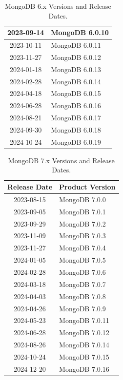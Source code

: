 \documentclass[../main.tex]{subfiles}
\begin{document}
\begin{table}[H]
\begin{minipage}{0.45\textwidth}
\begin{tabular}{|c|l|}
    2023-09-14 & MongoDB 6.0.10 \\ \hline
    2023-10-11 & MongoDB 6.0.11 \\ \hline
    2023-11-27 & MongoDB 6.0.12 \\ \hline
    2024-01-18 & MongoDB 6.0.13 \\ \hline
    2024-02-28 & MongoDB 6.0.14 \\ \hline
    2024-04-18 & MongoDB 6.0.15 \\ \hline
    2024-06-28 & MongoDB 6.0.16 \\ \hline
    2024-08-21 & MongoDB 6.0.17 \\ \hline
    2024-09-30 & MongoDB 6.0.18 \\ \hline
    2024-10-24 & MongoDB 6.0.19 \\ \hline
\end{tabular}
\caption{MongoDB 6.x Versions and Release Dates. \protect\footnotemark}
\label{table:mongodb_versions}
\end{minipage}
\end{table}


\begin{table}[h]
\centering
\begin{tabular}{|c|l|}
\hline
\textbf{Release Date} & \textbf{Product Version} \\ \hline
    2023-08-15 & MongoDB 7.0.0 \\ \hline
    2023-09-05 & MongoDB 7.0.1 \\ \hline
    2023-09-29 & MongoDB 7.0.2 \\ \hline
    2023-11-09 & MongoDB 7.0.3 \\ \hline
    2023-11-27 & MongoDB 7.0.4 \\ \hline
    2024-01-05 & MongoDB 7.0.5 \\ \hline
    2024-02-28 & MongoDB 7.0.6 \\ \hline
    2024-03-18 & MongoDB 7.0.7 \\ \hline
    2024-04-03 & MongoDB 7.0.8 \\ \hline
    2024-04-26 & MongoDB 7.0.9 \\ \hline
    2024-05-23 & MongoDB 7.0.11 \\ \hline
    2024-06-28 & MongoDB 7.0.12 \\ \hline
    2024-08-26 & MongoDB 7.0.14 \\ \hline
    2024-10-24 & MongoDB 7.0.15 \\ \hline
    2024-12-20 & MongoDB 7.0.16 \\ \hline
\end{tabular}
\caption{MongoDB 7.x Versions and Release Dates. \protect\footnotemark}
\label{table:mongodb_versions}
\end{table}
\end{document}
